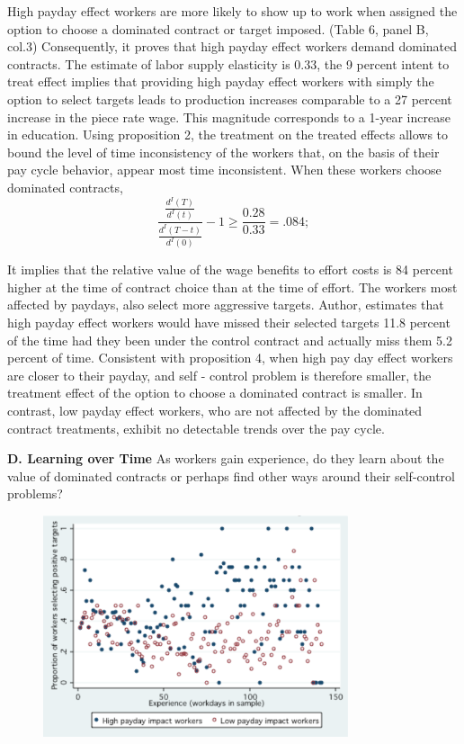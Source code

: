 \documentclass[a4paper,12pt]{article}
\begin{document}
High payday effect workers are more likely to show up to work when assigned the option to choose a dominated contract or target imposed. (Table 6, panel B, col.3)
Consequently, it proves that high payday effect workers demand dominated contracts. The estimate of labor supply elasticity is 0.33, the 9 percent intent to treat effect implies that providing high payday effect workers with simply the option to select targets leads to production increases comparable to a 27 percent increase in the piece rate wage. This magnitude corresponds to a 1-year increase in education. Using proposition 2, the treatment on the treated effects allows to bound the level of time inconsistency of the workers that, on the basis of their pay cycle behavior, appear most time inconsistent. When these workers choose dominated contracts, 
\begin{equation}
\frac{\frac{d^I(T)}{d^I(t)}}{\frac{d^I(T-t)}{d^I(0)}}  - 1 \geq  \frac{0.28}{0.33}=.084; 
\end{equation}


It implies that the relative value of the wage benefits to effort costs is 84 percent higher at the time of contract choice than at the time of effort. The workers most affected by paydays, also select more aggressive targets. Author, estimates that high payday effect workers would have missed their selected targets 11.8 percent of the time had they been under the control contract and actually miss them 5.2 percent of time. Consistent with proposition 4, when high pay day effect workers are closer to their payday, and self - control problem is therefore smaller, the treatment effect of the option to choose a dominated contract is smaller. In contrast, low payday effect workers, who are not affected by the dominated contract treatments, exhibit no detectable trends over the pay cycle. 

\textbf{D. Learning over Time} 
As workers gain experience, do they learn about the value of dominated contracts or perhaps find other ways around their self-control problems? 
\begin{figure}[h]
\centering
\includegraphics[width=0.8\textwidth]{Figure1_5.png}
\caption{\label{fig:Figure1.5}}
\end{figure}
\end{document}
